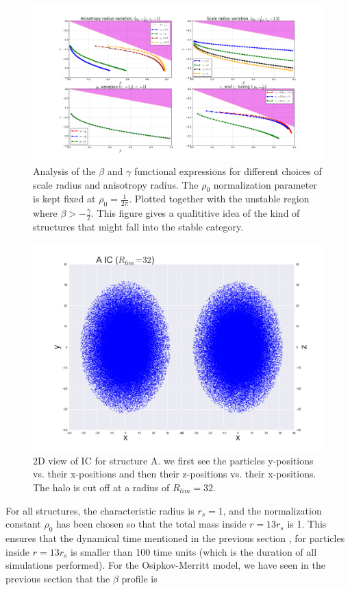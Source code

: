 \begin{figure}[!htbp]
\centering
\includegraphics[width=1.0\linewidth]{img/beta_gamma_functions.png}
\caption{Analysis of the $\beta$ and $\gamma$ functional expressions for different choices of scale radius and anisotropy radius. The $\rho_0$ normalization parameter is kept fixed at $\rho_0 = \frac{1}{2 \pi}$. Plotted together with the unstable region where $\beta > -\frac{\gamma}{2}$. This figure gives a qualititive idea of the kind of structures that might fall into the stable category.}
\label{fig:test}
\end{figure}
\begin{figure}[!htbp]
\centering
\includegraphics[width=1.0\linewidth]{img/A_IC_xy_xz.png}
\caption{2D view of IC for structure A. we first see the particles y-positions vs. their x-positions and then their z-positions vs. their x-positions. The halo is cut off at a radius of $R_{lim}=32$.}
\label{fig:test}
\end{figure}
For all structures, the characteristic radius is $r_s = 1$, and the normalization constant $\rho_0 $ has been chosen so that the total mass inside $r = 13r_s$ is 1. This ensures that the dynamical time mentioned in the previous section , for particles inside $r = 13r_s$ is smaller than 100 time units (which is the duration of all simulations performed). For the Osipkov-Merritt model, we have seen in the previous section that the $\beta$ profile is 
